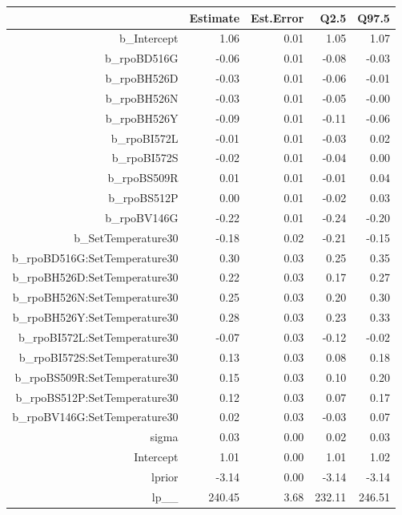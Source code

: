 \begin{table}[ht]
\centering
\begin{tabular}{rrrrr}
  \hline
 & Estimate & Est.Error & Q2.5 & Q97.5 \\ 
  \hline
b\_Intercept & 1.06 & 0.01 & 1.05 & 1.07 \\ 
  b\_rpoBD516G & -0.06 & 0.01 & -0.08 & -0.03 \\ 
  b\_rpoBH526D & -0.03 & 0.01 & -0.06 & -0.01 \\ 
  b\_rpoBH526N & -0.03 & 0.01 & -0.05 & -0.00 \\ 
  b\_rpoBH526Y & -0.09 & 0.01 & -0.11 & -0.06 \\ 
  b\_rpoBI572L & -0.01 & 0.01 & -0.03 & 0.02 \\ 
  b\_rpoBI572S & -0.02 & 0.01 & -0.04 & 0.00 \\ 
  b\_rpoBS509R & 0.01 & 0.01 & -0.01 & 0.04 \\ 
  b\_rpoBS512P & 0.00 & 0.01 & -0.02 & 0.03 \\ 
  b\_rpoBV146G & -0.22 & 0.01 & -0.24 & -0.20 \\ 
  b\_SetTemperature30 & -0.18 & 0.02 & -0.21 & -0.15 \\ 
  b\_rpoBD516G:SetTemperature30 & 0.30 & 0.03 & 0.25 & 0.35 \\ 
  b\_rpoBH526D:SetTemperature30 & 0.22 & 0.03 & 0.17 & 0.27 \\ 
  b\_rpoBH526N:SetTemperature30 & 0.25 & 0.03 & 0.20 & 0.30 \\ 
  b\_rpoBH526Y:SetTemperature30 & 0.28 & 0.03 & 0.23 & 0.33 \\ 
  b\_rpoBI572L:SetTemperature30 & -0.07 & 0.03 & -0.12 & -0.02 \\ 
  b\_rpoBI572S:SetTemperature30 & 0.13 & 0.03 & 0.08 & 0.18 \\ 
  b\_rpoBS509R:SetTemperature30 & 0.15 & 0.03 & 0.10 & 0.20 \\ 
  b\_rpoBS512P:SetTemperature30 & 0.12 & 0.03 & 0.07 & 0.17 \\ 
  b\_rpoBV146G:SetTemperature30 & 0.02 & 0.03 & -0.03 & 0.07 \\ 
  sigma & 0.03 & 0.00 & 0.02 & 0.03 \\ 
  Intercept & 1.01 & 0.00 & 1.01 & 1.02 \\ 
  lprior & -3.14 & 0.00 & -3.14 & -3.14 \\ 
  lp\_\_ & 240.45 & 3.68 & 232.11 & 246.51 \\ 
   \hline
\end{tabular}
\end{table}
